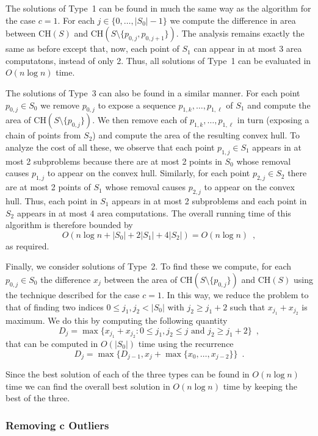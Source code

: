 \documentclass[lotsofwhite]{patmorin}
\newcommand{\ch}{\mathrm{CH}}
\begin{document}
The solutions of Type~1 can be found in much the same way as the
algorithm for the case $c=1$.  For each $j\in\{0,\ldots,|S_0|-1\}$ we
compute the difference in area between $\ch(S)$ and
$\ch(S\setminus\{p_{0,j},p_{0,j+1}\})$.  The analysis remains exactly
the same as before except that, now, each point of $S_1$ can appear in
at most $3$ area computatons, instead of only 2.  Thus, all solutions
of Type~1 can be evaluated in $O(n\log n)$ time.

The solutions of Type~3 can also be found in a similar manner.  For
each point $p_{0,j}\in S_0$ we remove $p_{0,j}$ to expose a sequence
$p_{1,k},\ldots,p_{1,\ell}$ of $S_1$ and compute the area of
$\ch(S\setminus\{p_{0,j}\})$.  We then remove each of
$p_{1,k},\ldots,p_{1,\ell}$ in turn (exposing a chain of points from
$S_2$) and compute the area of the resulting convex hull.  To analyze
the cost of all these, we observe that each point $p_{1,j}\in S_1$
appears in at most 2 subproblems because there are at most 2 points in
$S_0$ whose removal causes $p_{1,j}$ to appear on the convex hull.
Similarly, for each point $p_{2,j}\in S_2$ there are at most 2 points
of $S_1$ whose removal causes $p_{2,j}$ to appear on the convex hull.
Thus, each point in $S_1$ appears in at most 2 subproblems and each
point in $S_2$ appears in at most $4$ area computations.  The overall
running time of this algorithm is therefore bounded by
\[
    O\left(n\log n + |S_0| + 2|S_1| + 4|S_2|\right) = O(n\log n) \enspace ,
\]
as required.

Finally, we consider solutions of Type~2.  To find these we compute,
for each $p_{0,j}\in S_0$ the difference $x_j$ between the area of
$\ch(S\setminus\{p_{0,j}\})$ and $\ch(S)$ using the technique
described for the case $c=1$.  In this way, we reduce the problem to
that of finding two indices $0\le j_1,j_2< |S_0|$ with $j_2\ge j_1+2$
such that $x_{j_1}+x_{j_2}$ is maximum.  We do this by computing the
following quantity
\[
     D_j = \max\{x_{j_1}+x_{j_2} :
       \mbox{$0\le j_1,j_2\le j$ and $j_2 \ge j_1+2$}\} \enspace ,
\]
that can be computed in $O(|S_0|)$ time using the recurrence
\[
    D_j = \max\{D_{j-1}, x_{j} + \max\{x_{0},\ldots,x_{j-2}\}\}
                \enspace .
\]

Since the best solution of each of the three types can be found in
$O(n\log n)$ time we can find the overall best solution in $O(n\log
n)$ time by keeping the best of the three.

\subsubsection{Removing $\mathbf{c}$ Outliers}
\end{document}
